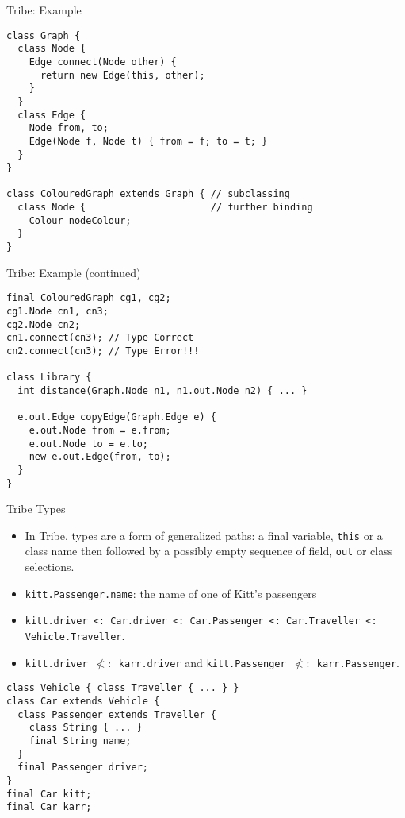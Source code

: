 \documentclass{beamer}
\begin{document}
\begin{frame}[fragile]{Tribe: Example}
\begin{verbatim}
class Graph {
  class Node {
    Edge connect(Node other) {
      return new Edge(this, other);
    }
  }
  class Edge {
    Node from, to;
    Edge(Node f, Node t) { from = f; to = t; }
  }
}

class ColouredGraph extends Graph { // subclassing
  class Node {                      // further binding
    Colour nodeColour;
  }
}
\end{verbatim}
\end{frame}

\begin{frame}[fragile]{Tribe: Example (continued)}
\begin{verbatim}
final ColouredGraph cg1, cg2;
cg1.Node cn1, cn3;
cg2.Node cn2;
cn1.connect(cn3); // Type Correct
cn2.connect(cn3); // Type Error!!!

class Library {
  int distance(Graph.Node n1, n1.out.Node n2) { ... }

  e.out.Edge copyEdge(Graph.Edge e) {
    e.out.Node from = e.from;
    e.out.Node to = e.to;
    new e.out.Edge(from, to);
  }
}
\end{verbatim}
\end{frame}

\begin{frame}[fragile]{Tribe Types}
\begin{itemize}
\item In Tribe, types are a form of generalized paths: a final
  variable, {\tt this} or a class name then followed by a possibly
  empty sequence of field, {\tt out} or class selections.
\item {\tt kitt.Passenger.name}: the name of one of Kitt's passengers
\item {\tt kitt.driver <: Car.driver <: Car.Passenger <: Car.Traveller <:
  Vehicle.Traveller}.
\item {\tt kitt.driver $\not<:$ karr.driver} and {\tt kitt.Passenger $\not<:$ karr.Passenger}.
\end{itemize}
\begin{verbatim}
class Vehicle { class Traveller { ... } }
class Car extends Vehicle {
  class Passenger extends Traveller {
    class String { ... }
    final String name;
  }
  final Passenger driver;
}
final Car kitt;
final Car karr;
\end{verbatim}
\end{frame}
\end{document}
